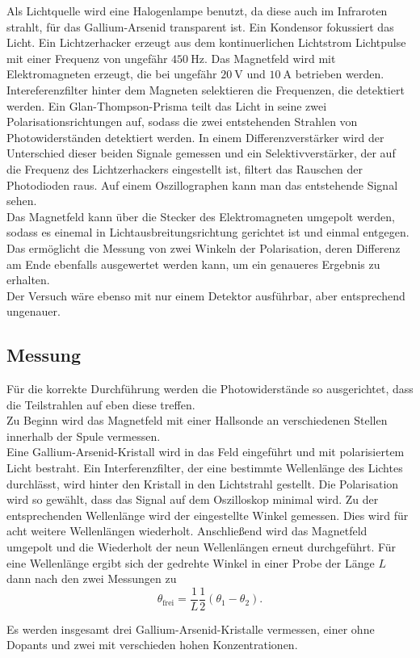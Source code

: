 Als Lichtquelle wird eine Halogenlampe benutzt, da diese auch im Infraroten strahlt, für das Gallium-Arsenid transparent ist. Ein Kondensor fokussiert das Licht. Ein Lichtzerhacker erzeugt aus dem kontinuerlichen
Lichtstrom Lichtpulse mit einer Frequenz von ungefähr $\qty{450}{\hertz}$. Das Magnetfeld wird mit Elektromagneten erzeugt, die bei ungefähr $\qty{20}{\volt}$ und $\qty{10}{\ampere}$ betrieben werden. Intereferenzfilter hinter
dem Magneten selektieren die Frequenzen, die detektiert werden. Ein Glan-Thompson-Prisma teilt das Licht in seine zwei Polarisationsrichtungen auf, sodass die zwei entstehenden Strahlen von Photowiderständen detektiert werden.
In einem Differenzverstärker wird der Unterschied dieser beiden Signale gemessen und ein Selektivverstärker, der auf die Frequenz des Lichtzerhackers eingestellt ist, filtert das Rauschen der Photodioden raus. Auf einem Oszillographen
kann man das entstehende Signal sehen. \\

Das Magnetfeld kann über die Stecker des Elektromagneten umgepolt werden, sodass es einemal in Lichtausbreitungsrichtung gerichtet ist und einmal entgegen. Das ermöglicht die Messung von zwei Winkeln der Polarisation,
deren Differenz am Ende ebenfalls ausgewertet werden kann, um ein genaueres Ergebnis zu erhalten. \\

Der Versuch wäre ebenso mit nur einem Detektor ausführbar, aber entsprechend ungenauer.\\

\subsection{Messung}

Für die korrekte Durchführung werden die Photowiderstände so ausgerichtet, dass die Teilstrahlen auf eben diese treffen. \\
Zu Beginn wird das Magnetfeld mit einer Hallsonde an verschiedenen Stellen innerhalb der Spule vermessen. \\

Eine Gallium-Arsenid-Kristall wird in das Feld eingeführt und mit polarisiertem Licht bestraht. Ein Interferenzfilter, der eine bestimmte Wellenlänge des Lichtes durchlässt, wird hinter den Kristall in den Lichtstrahl gestellt.
Die Polarisation wird so gewählt, dass das Signal auf dem Oszilloskop minimal wird. Zu der entsprechenden Wellenlänge wird der eingestellte Winkel gemessen. Dies wird für acht weitere Wellenlängen wiederholt. Anschließend wird das Magnetfeld
umgepolt und die Wiederholt der neun Wellenlängen erneut durchgeführt. Für eine Wellenlänge ergibt sich der gedrehte Winkel in einer Probe der Länge $L$ dann nach den zwei Messungen zu
\begin{equation}
    \theta_\text{frei} = \frac{1}{L} \frac{1}{2}(\theta_1 - \theta_2).
    \label{eq:theta}
\end{equation}

Es werden insgesamt drei Gallium-Arsenid-Kristalle vermessen, einer ohne Dopants und zwei mit verschieden hohen Konzentrationen. \\

